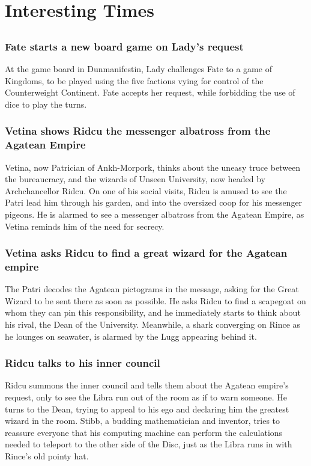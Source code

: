 \section{Interesting Times}


\subsection{}
\subsubsection{\Gls{Fate} starts a new board game on \Gls{Lady}'s request}
At the game board in Dunmanifestin, \Gls{Lady} challenges \Gls{Fate} to a game of Kingdoms, to be
played using the five factions vying for control of the Counterweight Continent. \Gls{Fate} accepts
her request, while forbidding the use of dice to play the turns.

\subsubsection{\Gls{Vetina} shows \Gls{Ridcu} the messenger albatross from the Agatean Empire}
\Gls{Vetina}, now Patrician of Ankh-Morpork, thinks about the uneasy truce between the bureaucracy,
and the wizards of Unseen University, now headed by Archchancellor \Gls{Ridcu}. On one of his social
visits, \Gls{Ridcu} is amused to see the \Gls{Patri} lead him through his garden, and into the
oversized coop for his messenger pigeons. He is alarmed to see a messenger albatross from the
Agatean Empire, as \Gls{Vetina} reminds him of the need for secrecy.

\subsubsection{\Gls{Vetina} asks \Gls{Ridcu} to find a great wizard for the Agatean empire}
The \Gls{Patri} decodes the Agatean pictograms in the message, asking for the Great Wizard to be
sent there as soon as possible. He asks \Gls{Ridcu} to find a scapegoat on whom they can pin this
responsibility, and he immediately starts to think about his rival, the \Gls{Dean} of the
University. Meanwhile, a shark converging on \Gls{Rince} as he lounges on seawater, is alarmed by
the \Gls{Lugg} appearing behind it.

\subsubsection{\Gls{Ridcu} talks to his inner council}
\Gls{Ridcu} summons the inner council and tells them about the Agatean empire's request, only to
see the \Gls{Libra} run out of the room as if to warn someone. He turns to the \Gls{Dean}, trying
to appeal to his ego and declaring him the greatest wizard in the room. \Gls{Stibb}, a budding
mathematician and inventor, tries to reassure everyone that his computing machine can perform the
calculations needed to teleport to the other side of the Disc, just as the \Gls{Libra} runs in with
\Gls{Rince}'s old pointy hat.

